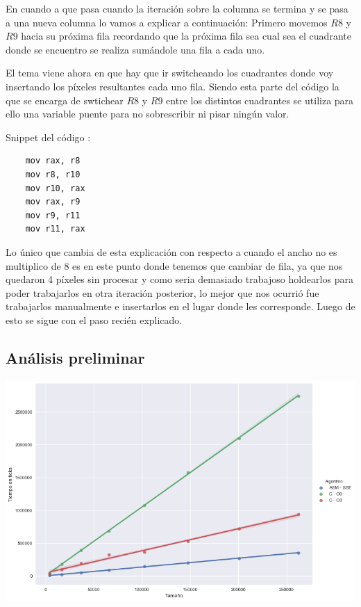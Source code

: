 En cuando a que pasa cuando la iteración sobre la columna se termina y se pasa a una nueva columna lo vamos a explicar a continuación:
Primero movemos $R8$ y $R9$ hacia su próxima fila recordando que la próxima fila sea cual sea el cuadrante donde se encuentro se realiza sumándole una fila a cada uno.

El tema viene ahora en que hay que ir switcheando los cuadrantes donde voy insertando los píxeles resultantes cada uno fila. Siendo esta parte del código la que se encarga de swtichear $R8$ y $R9$ entre los distintos cuadrantes se utiliza para ello una variable puente para no sobrescribir ni pisar ningún valor. 

Snippet del código :

\begin{lstlisting}
	mov rax, r8
	mov r8, r10
	mov r10, rax
	mov rax, r9
	mov r9, r11
	mov r11, rax
\end{lstlisting}

Lo único que cambia de esta explicación con respecto a cuando el ancho no es multiplico de 8 es en este punto donde tenemos que cambiar de fila, ya que nos quedaron 4 píxeles sin procesar y como seria demasiado trabajoso holdearlos para poder trabajarlos en otra iteración posterior, lo mejor que nos ocurrió fue trabajarlos manualmente e insertarlos en el lugar donde les corresponde. Luego de esto se sigue con el paso recién explicado.


\subsection{Análisis preliminar}

\begin{center}
	\includegraphics[scale=0.5]{img/fourCombine_CvsASMvsO3.png}
\end{center}

